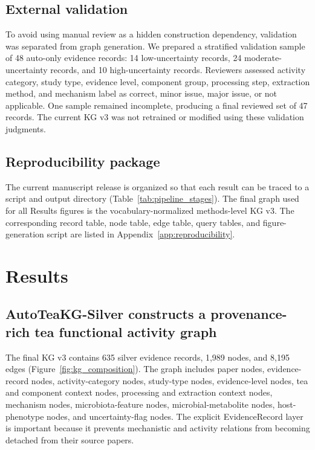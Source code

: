 \documentclass[11pt]{article}
\begin{document}
\subsection{External validation}

To avoid using manual review as a hidden construction dependency, validation was separated from graph generation. We prepared a stratified validation sample of 48 auto-only evidence records: 14 low-uncertainty records, 24 moderate-uncertainty records, and 10 high-uncertainty records. Reviewers assessed activity category, study type, evidence level, component group, processing step, extraction method, and mechanism label as correct, minor issue, major issue, or not applicable. One sample remained incomplete, producing a final reviewed set of 47 records. The current KG v3 was not retrained or modified using these validation judgments.

\subsection{Reproducibility package}

The current manuscript release is organized so that each result can be traced to a script and output directory (Table~\ref{tab:pipeline_stages}). The final graph used for all Results figures is the vocabulary-normalized methods-level KG v3. The corresponding record table, node table, edge table, query tables, and figure-generation script are listed in Appendix~\ref{app:reproducibility}.

\section{Results}

\subsection{AutoTeaKG-Silver constructs a provenance-rich tea functional activity graph}

The final KG v3 contains 635 silver evidence records, 1,989 nodes, and 8,195 edges (Figure~\ref{fig:kg_composition}). The graph includes paper nodes, evidence-record nodes, activity-category nodes, study-type nodes, evidence-level nodes, tea and component context nodes, processing and extraction context nodes, mechanism nodes, microbiota-feature nodes, microbial-metabolite nodes, host-phenotype nodes, and uncertainty-flag nodes. The explicit EvidenceRecord layer is important because it prevents mechanistic and activity relations from becoming detached from their source papers.
\end{document}
